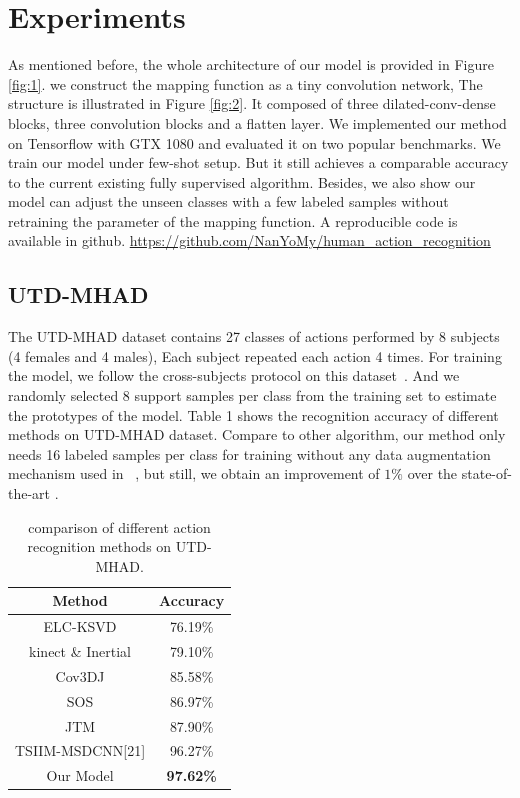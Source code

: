 \documentclass{bmvc2k}
\begin{document}
\section{Experiments}
As mentioned before, the whole architecture of our model is provided in Figure \ref{fig:1}. we construct the mapping function as a tiny convolution network, The structure is illustrated in Figure \ref{fig:2}. It composed of three dilated-conv-dense blocks, three convolution blocks and a flatten layer. We implemented our method on Tensorflow with GTX 1080 and evaluated it on two popular benchmarks. We train our model under few-shot setup. But it still achieves a comparable accuracy to the current existing fully supervised algorithm. Besides, we also show our model can adjust the unseen classes with a few labeled samples without retraining the parameter of the mapping function. A reproducible code is available in github. \url{https://github.com/NanYoMy/human_action_recognition}

\subsection*{UTD-MHAD}
The UTD-MHAD dataset contains 27 classes of actions performed by 8 subjects (4 females and 4 males), Each subject repeated each action 4 times. For training the model, we follow the cross-subjects protocol on this dataset~\cite{chen2015utd}. And we randomly selected 8 support samples per class from the training set to estimate the prototypes of the model. Table 1 shows the recognition accuracy of different methods on UTD-MHAD dataset. Compare to other algorithm, our method only needs 16 labeled samples per class for training without any data augmentation mechanism used in ~\cite{pham2017learning,li2017skeleton_2}, but still, we obtain an improvement of $1\%$ over the state-of-the-art .

\begin{table}[htb]
	\begin{center}		
		\begin{tabular}{|c|c|}
			\hline
			Method & Accuracy \\
			\hline\hline
			ELC-KSVD & 76.19\% \\
			kinect \& Inertial & 79.10\% \\
			Cov3DJ & 85.58\%\\
			SOS & 86.97\% \\
			JTM & 87.90\% \\
			TSIIM-MSDCNN[21] & 96.27\% \\
			Our Model & \bf{97.62\%} \\
			\hline
		\end{tabular}	
	\end{center}		
	\caption{ comparison of different action recognition methods on UTD-MHAD.}
	\label{tab:1}
\end{table}
\end{document}
